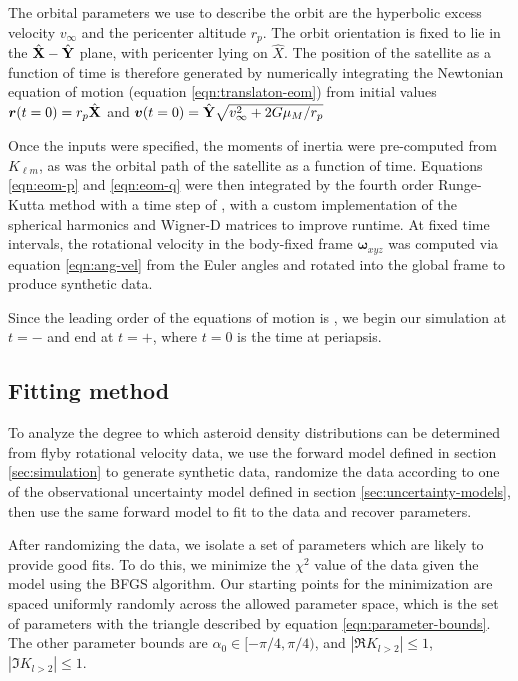 \documentclass[11pt]{article}
\begin{document}
The orbital parameters we use to describe the orbit are the hyperbolic excess velocity $v_\infty$ and the pericenter altitude $r_p$. The orbit orientation is fixed to lie in the $\hat{\mathbf{X}}-\hat{\mathbf{Y}}$ plane, with pericenter lying on $\hat X$. The position of the satellite as a function of time is therefore generated by numerically integrating the Newtonian equation of motion (equation \ref{eqn:translaton-eom}) from initial values $\bm r(t=0) = r_p \hat{\mathbf{X}}$ and $\bm v(t=0)=\hat{\mathbf{Y}} \sqrt{v_\infty^2 + 2G\mu_M / r_p}$

Once the inputs were specified, the moments of inertia were pre-computed from $K_{\ell m}$, as was the orbital path of the satellite as a function of time. Equations \ref{eqn:eom-p} and \ref{eqn:eom-q} were then integrated by the fourth order Runge-Kutta method with a time step of , with a custom implementation of the spherical harmonics and Wigner-D matrices to improve runtime. At fixed time intervals, the rotational velocity in the body-fixed frame $\bm\omega_{xyz}$ was computed via equation \ref{eqn:ang-vel} from the Euler angles and rotated into the global frame to produce synthetic data.

Since the leading order of the equations of motion is , we begin our simulation at $t=-$  and end at $t=+$, where $t=0$ is the time at periapsis.



\subsection{Fitting method}
To analyze the degree to which asteroid density distributions can be determined from flyby rotational velocity data, we use the forward model defined in section \ref{sec:simulation} to generate synthetic data, randomize the data according to one of the observational uncertainty model defined in section \ref{sec:uncertainty-models}, then use the same forward model to fit to the data and recover parameters.

After randomizing the data, we isolate a set of parameters which are likely to provide good fits. To do this, we minimize the $\chi^2$ value of the data given the model using the BFGS algorithm. Our starting points for the minimization are spaced uniformly randomly across the allowed parameter space, which is the set of parameters with the triangle described by equation \ref{eqn:parameter-bounds}. The other parameter bounds are $\alpha_0 \in [-\pi/4, \pi/4)$, and $|\Re K_{l>2}| \leq  1$, $|\Im K_{l>2}| \leq  1$.
\end{document}
